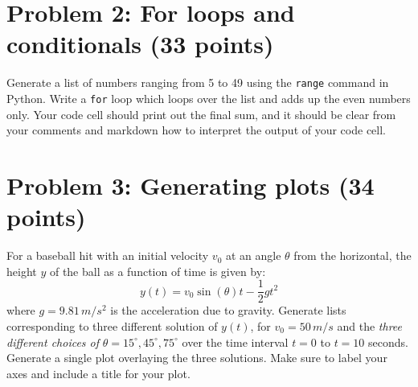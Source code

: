 \documentclass[12pt]{article}
\begin{document}
\section*{Problem 2: For loops and conditionals (33 points)}
Generate a list of numbers ranging from 5 to 49 using the \texttt{range} command in Python. Write a \texttt{for} loop which loops over the list and adds up the even numbers only. Your code cell should print out the final sum, and it should be clear from your comments and markdown how to interpret the output of your code cell.

\section*{Problem 3: Generating plots (34 points)}
For a baseball hit with an initial velocity \(v_0\) at an angle \(\theta\) from the horizontal, the height \(y\) of the ball as a function of time is given by:
\[y(t) = v_0 \sin(\theta) t - \frac{1}{2} g t^2\]
where \(g = 9.81 \, m/s^2\) is the acceleration due to gravity. Generate lists corresponding to three different solution of \(y(t)\), for \(v_0 = 50 \, m/s\) and the \textit{three different choices of } \(\theta = 15^\circ, 45^\circ, 75^\circ\) over the time interval \(t = 0\) to \(t = 10\) seconds. Generate a single plot overlaying the three solutions. Make sure to label your axes and include a title for your plot.
\end{document}
